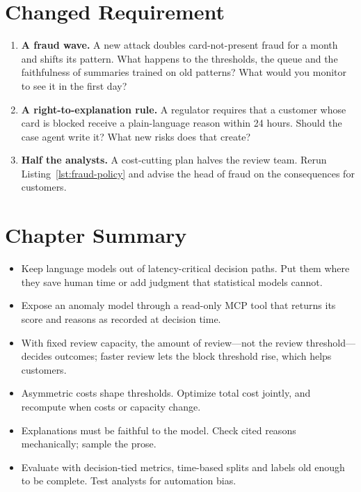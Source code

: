 \section{Changed Requirement}
\label{sec:fr-changed}

\begin{enumerate}[itemsep=3pt]
  \item \textbf{A fraud wave.} A new attack doubles card-not-present fraud for a month and shifts its pattern. What happens to the thresholds, the queue and the faithfulness of summaries trained on old patterns? What would you monitor to see it in the first day?
  \item \textbf{A right-to-explanation rule.} A regulator requires that a customer whose card is blocked receive a plain-language reason within 24 hours. Should the case agent write it? What new risks does that create?
  \item \textbf{Half the analysts.} A cost-cutting plan halves the review team. Rerun Listing~\ref{lst:fraud-policy} and advise the head of fraud on the consequences for customers.
\end{enumerate}

\section*{Chapter Summary}

\begin{itemize}[itemsep=2pt]
  \item Keep language models out of latency-critical decision paths. Put them where they save human time or add judgment that statistical models cannot.
  \item Expose an anomaly model through a read-only MCP tool that returns its score and reasons as recorded at decision time.
  \item With fixed review capacity, the amount of review---not the review threshold---decides outcomes; faster review lets the block threshold rise, which helps customers.
  \item Asymmetric costs shape thresholds. Optimize total cost jointly, and recompute when costs or capacity change.
  \item Explanations must be faithful to the model. Check cited reasons mechanically; sample the prose.
  \item Evaluate with decision-tied metrics, time-based splits and labels old enough to be complete. Test analysts for automation bias.
\end{itemize}

